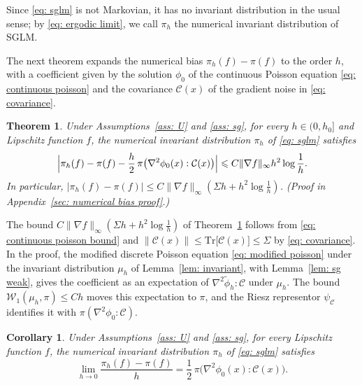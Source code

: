 \documentclass{article}
\newtheorem{theorem}{Theorem}
\newtheorem{corollary}{Corollary}
\newcommand{\Le}{\leqslant}
\newcommand{\norm}[1]{\lVert #1 \rVert}
\numberwithin{equation}{section}
\begin{document}
Since \eqref{eq: sglm} is not Markovian, it has no invariant distribution in the usual sense; by \eqref{eq: ergodic limit}, we call $\pi_h$ the numerical invariant distribution of SGLM.

The next theorem expands the numerical bias $\pi_h(f) - \pi(f)$ to the order $h$, with a coefficient given by the solution $\phi_0$ of the continuous Poisson equation \eqref{eq: continuous poisson} and the covariance $\mathcal C(x)$ of the gradient noise in \eqref{eq: covariance}.

\begin{theorem}
\label{thm: numerical bias}
    Under Assumptions~\ref{ass: U} and \ref{ass: sg}, for every $h \in (0,h_0]$ and Lipschitz function $f$, the numerical invariant distribution $\pi_h$ of \eqref{eq: sglm} satisfies
    \begin{equation}
        \Bigl| \pi_h(f) - \pi(f) - \frac h2\, \pi\bigl( \nabla^2 \phi_0(x) : \mathcal C(x) \bigr) \Bigr| \Le C \norm{\nabla f}_\infty h^2 \log\frac1h .
        \label{eq: numerical bias}
    \end{equation}
    In particular, $|\pi_h(f) - \pi(f)| \Le C \norm{\nabla f}_\infty ( \Sigma h + h^2 \log\frac1h )$. \emph{(Proof in Appendix~\ref{sec: numerical bias proof}.)}
\end{theorem}

The bound $C \norm{\nabla f}_\infty (\Sigma h + h^2 \log\frac1h)$ of Theorem~\ref{thm: numerical bias} follows from \eqref{eq: continuous poisson bound} and $\norm{\mathcal C(x)} \Le \mathrm{Tr}\bigl[ \mathcal C(x) \bigr] \Le \Sigma$ by \eqref{eq: covariance}. In the proof, the modified discrete Poisson equation \eqref{eq: modified poisson} under the invariant distribution $\mu_h$ of Lemma~\ref{lem: invariant}, with Lemma~\ref{lem: sg weak}, gives the coefficient as an expectation of $\nabla^2 \tilde\phi_h : \mathcal C$ under $\mu_h$. The bound $\mathcal W_1(\mu_h, \pi) \Le C h$ moves this expectation to $\pi$, and the Riesz representor $\psi_{\mathcal C}$ identifies it with $\pi( \nabla^2 \phi_0 : \mathcal C )$.

\begin{corollary}
\label{cor: bias coefficient}
    Under Assumptions~\ref{ass: U} and \ref{ass: sg}, for every Lipschitz function $f$, the numerical invariant distribution $\pi_h$ of \eqref{eq: sglm} satisfies
    \begin{equation}
        \lim_{h \to 0} \frac{\pi_h(f) - \pi(f)}{h} = \frac12\, \pi\bigl( \nabla^2 \phi_0(x) : \mathcal C(x) \bigr) .
        \label{eq: bias coefficient}
    \end{equation}
\end{corollary}
\end{document}
